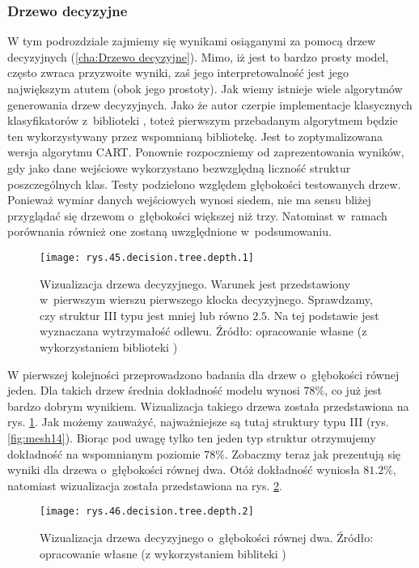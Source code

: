 \subsubsection{Drzewo decyzyjne}
\label{structures.with.dt}

W tym podrozdziale zajmiemy się wynikami osiąganymi za pomocą drzew decyzyjnych (\ref{cha:Drzewo decyzyjne}). Mimo, iż jest to bardzo prosty model, często zwraca przyzwoite wyniki, zaś jego interpretowalność jest jego największym atutem (obok jego prostoty). 
Jak wiemy istnieje wiele algorytmów generowania drzew decyzyjnych. Jako że autor czerpie implementacje klasycznych klasyfikatorów z~biblioteki , toteż pierwszym przebadanym algorytmem będzie ten wykorzystywany przez wspomnianą bibliotekę. Jest to zoptymalizowana wersja algorytmu CART.
Ponownie rozpoczniemy od zaprezentowania wyników, gdy jako dane wejściowe wykorzystano bezwzględną liczność struktur poszczególnych klas. Testy podzielono względem głębokości testowanych drzew. Ponieważ wymiar danych wejściowych wynosi siedem, nie ma sensu bliżej przyglądać się drzewom o~głębokości większej niż trzy. Natomiast w~ramach porównania również one zostaną uwzględnione w~podsumowaniu. 
\begin{figure}[h]
    \centering
    \texttt{[image: rys.45.decision.tree.depth.1]}
    \caption{Wizualizacja drzewa decyzyjnego. Warunek jest przedstawiony w~pierwszym wierszu pierwszego klocka decyzyjnego. Sprawdzamy, czy struktur III typu jest mniej lub równo $2.5$. Na tej podstawie jest wyznaczana wytrzymałość odlewu. Źródło: opracowanie własne (z wykorzystaniem biblioteki )}
    \label{rys.45.decision.tree.depth.1}
\end{figure}
W pierwszej kolejności przeprowadzono badania dla drzew o~głębokości równej jeden. Dla takich drzew średnia dokładność modelu wynosi $78\%$, co już jest bardzo dobrym wynikiem. Wizualizacja takiego drzewa została przedstawiona na rys. \ref{rys.45.decision.tree.depth.1}. 
Jak możemy zauważyć, najważniejsze są tutaj struktury typu III (rys. \ref{fig:mesh14}). Biorąc pod uwagę tylko ten jeden typ struktur otrzymujemy dokładność na wspomnianym poziomie $78\%$. Zobaczmy teraz jak prezentują się wyniki dla drzewa o~głębokości równej dwa. Otóż dokładność wyniosła $81.2\%$, natomiast wizualizacja została przedstawiona na rys. \ref{rys.46.decision.tree.depth.2}. 
\begin{figure}[h]
    \centering
    \texttt{[image: rys.46.decision.tree.depth.2]}
    \caption{Wizualizacja drzewa decyzyjnego o~głębokości równej dwa. Źródło: opracowanie własne (z wykorzystaniem bibliteki )}
    \label{rys.46.decision.tree.depth.2}
\end{figure}
